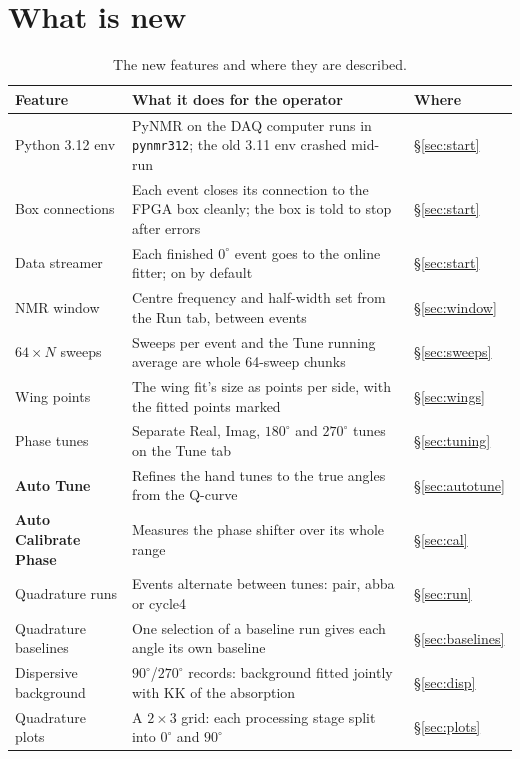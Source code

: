 \documentclass[11pt]{article}
\newcommand{\code}[1]{\texttt{\begingroup\def\_{\textunderscore\allowbreak}#1\endgroup}}
\newcommand{\btn}[1]{\textsf{\textbf{#1}}}   %
\begin{document}
\section{What is new}
\label{sec:new}

\begin{table}[ht]
\centering\small
\begin{tabularx}{\textwidth}{@{}lXl@{}}
\toprule
Feature & What it does for the operator & Where \\
\midrule
Python 3.12 env & PyNMR on the DAQ computer runs in \code{pynmr312}; the old 3.11 env crashed mid-run & \S\ref{sec:start} \\
Box connections & Each event closes its connection to the FPGA box cleanly; the box is told to stop after errors & \S\ref{sec:start} \\
Data streamer & Each finished $0^\circ$ event goes to the online fitter; on by default & \S\ref{sec:start} \\
NMR window & Centre frequency and half-width set from the Run tab, between events & \S\ref{sec:window} \\
$64\times N$ sweeps & Sweeps per event and the Tune running average are whole 64-sweep chunks & \S\ref{sec:sweeps} \\
Wing points & The wing fit's size as points per side, with the fitted points marked & \S\ref{sec:wings} \\
Phase tunes & Separate Real, Imag, $180^\circ$ and $270^\circ$ tunes on the Tune tab & \S\ref{sec:tuning} \\
\btn{Auto Tune} & Refines the hand tunes to the true angles from the Q-curve & \S\ref{sec:autotune} \\
\btn{Auto Calibrate Phase} & Measures the phase shifter over its whole range & \S\ref{sec:cal} \\
Quadrature runs & Events alternate between tunes: pair, abba or cycle4 & \S\ref{sec:run} \\
Quadrature baselines & One selection of a baseline run gives each angle its own baseline & \S\ref{sec:baselines} \\
Dispersive background & $90^\circ$/$270^\circ$ records: background fitted jointly with KK of the absorption & \S\ref{sec:disp} \\
Quadrature plots & A $2\times3$ grid: each processing stage split into $0^\circ$ and $90^\circ$ & \S\ref{sec:plots} \\
\bottomrule
\end{tabularx}
\caption{The new features and where they are described.}
\label{tab:new}
\end{table}
\end{document}
